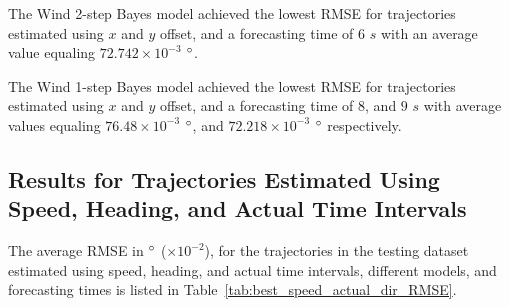 \documentclass[preprint,12pt]{elsarticle}
\begin{document}
The Wind 2-step Bayes model achieved the lowest RMSE for trajectories estimated using $x$ and $y$ offset, and a forecasting time of $6$ $s$ with an average value equaling $72.742 \times 10^{-3}$ $\degree$.

The Wind 1-step Bayes model achieved the lowest RMSE for trajectories estimated using $x$ and $y$ offset, and a forecasting time of $8$, and $9$ $s$ with average values equaling $76.48 \times 10^{-3}$ $\degree$, and $72.218 \times 10^{-3}$ $\degree$ respectively.

\subsection{Results for Trajectories Estimated Using Speed, Heading, and Actual Time Intervals}

The average RMSE in $\degree$ ($\times 10^{-2}$), for the trajectories in the testing dataset estimated using speed, heading, and actual time intervals, different models, and forecasting times is listed in Table~\ref{tab:best_speed_actual_dir_RMSE}.
\end{document}
